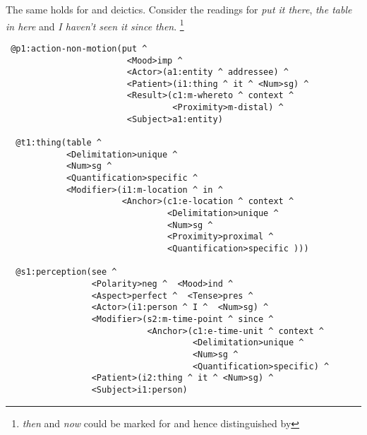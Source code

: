 The same holds for  and  deictics. Consider the readings for \emph{put it there}, \emph{the table in here} and \emph{I haven't seen it since then}. \footnote{ \emph{then} and \emph{now} could be marked for and hence distinguished by  }
\begin{verbatim}
 @p1:action-non-motion(put ^ 
                        <Mood>imp ^ 
                        <Actor>(a1:entity ^ addressee) ^ 
                        <Patient>(i1:thing ^ it ^ <Num>sg) ^ 
                        <Result>(c1:m-whereto ^ context ^ 
                                 <Proximity>m-distal) ^ 
                        <Subject>a1:entity)
 
  @t1:thing(table ^ 
            <Delimitation>unique ^ 
            <Num>sg ^ 
            <Quantification>specific ^ 
            <Modifier>(i1:m-location ^ in ^ 
                       <Anchor>(c1:e-location ^ context ^ 
                                <Delimitation>unique ^ 
                                <Num>sg ^ 
                                <Proximity>proximal ^ 
                                <Quantification>specific )))

  @s1:perception(see ^ 
                 <Polarity>neg ^  <Mood>ind ^ 
                 <Aspect>perfect ^  <Tense>pres ^ 
                 <Actor>(i1:person ^ I ^  <Num>sg) ^ 
                 <Modifier>(s2:m-time-point ^ since ^ 
                            <Anchor>(c1:e-time-unit ^ context ^ 
                                     <Delimitation>unique ^ 
                                     <Num>sg ^ 
                                     <Quantification>specific) ^ 
                 <Patient>(i2:thing ^ it ^ <Num>sg) ^ 
                 <Subject>i1:person)
\end{verbatim}      

